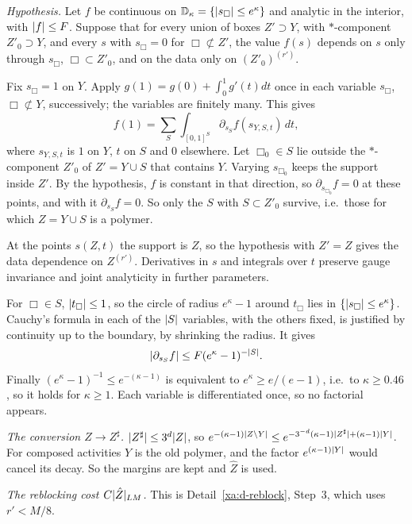 \begin{detail}\label{xa:d-loc}
\emph{Hypothesis.} Let $f$ be continuous on $\mathbb D_\kappa=\{\lvert s_\Box\rvert\le e^\kappa\}$ and analytic in the interior, with $\lvert f\rvert\le F$. Suppose that for every union of boxes $Z'\supset Y$, with $*$-component $Z'_0\supset Y$, and every $s$ with $s_\Box=0$ for $\Box\not\subset Z'$, the value $f(s)$ depends on $s$ only through $s_\Box$, $\Box\subset Z'_0$, and on the data only on $(Z'_0)^{(r')}$.

\begin{step}
Fix $s_\Box=1$ on $Y$. Apply $g(1)=g(0)+\int_0^1g'(t)dt$ once in each variable $s_\Box$, $\Box\not\subset Y$, successively; the variables are finitely many. This gives
\[
f(1)=\sum_S\int_{[0,1]^S}\partial_{s_S}f(s_{Y,S,t})\,dt,
\]
where $s_{Y,S,t}$ is $1$ on $Y$, $t$ on $S$ and $0$ elsewhere. Let $\Box_0\in S$ lie outside the $*$-component $Z'_0$ of $Z'=Y\cup S$ that contains $Y$. Varying $s_{\Box_0}$ keeps the support inside $Z'$. By the hypothesis, $f$ is constant in that direction, so $\partial_{s_{\Box_0}}f=0$ at these points, and with it $\partial_{s_S}f=0$. So only the $S$ with $S\subset Z'_0$ survive, i.e.\ those for which $Z=Y\cup S$ is a polymer.
\end{step}

\begin{step}[(a), (c)]
At the points $s(Z,t)$ the support is $Z$, so the hypothesis with $Z'=Z$ gives the data dependence on $Z^{(r')}$. Derivatives in $s$ and integrals over $t$ preserve gauge invariance and joint analyticity in further parameters.
\end{step}

\begin{step}[(b)]
For $\Box\in S$, $\lvert t_\Box\rvert\le1$, so the circle of radius $e^\kappa-1$ around $t_\Box$ lies in $\{\lvert s_\Box\rvert\le e^\kappa\}$. Cauchy's formula in each of the $\lvert S\rvert$ variables, with the others fixed, is justified by continuity up to the boundary, by shrinking the radius. It gives
\[
\lvert\partial_{s_S}f\rvert\le F(e^\kappa-1)^{-\lvert S\rvert}.
\]
Finally $(e^\kappa-1)^{-1}\le e^{-(\kappa-1)}$ is equivalent to $e^\kappa\ge e/(e-1)$, i.e.\ to $\kappa\ge0.46$, so it holds for $\kappa\ge1$. Each variable is differentiated once, so no factorial appears.
\end{step}
\end{detail}

\begin{detail}\label{xa:d-locmarg}
\emph{The conversion $Z\to Z^\sharp$.} $\lvert Z^\sharp\rvert\le3^d\lvert Z\rvert$, so $e^{-(\kappa-1)\lvert Z\setminus Y\rvert}\le e^{-3^{-d}(\kappa-1)\lvert Z^\sharp\rvert+(\kappa-1)\lvert Y\rvert}$. For composed activities $Y$ is the old polymer, and the factor $e^{(\kappa-1)\lvert Y\rvert}$ would cancel its decay. So the margins are kept and $\hat Z$ is used.

\emph{The reblocking cost $C\lvert\hat Z\rvert_{LM}$.} This is Detail~\ref{xa:d-reblock}, Step~3, which uses $r'<M/8$.
\end{detail}

